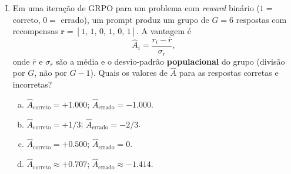 \documentclass{dlproblemset}
\begin{document}
\begin{enumerate}[I)]
\begin{enumerate}[a)]
    \item Comportamento esperado: SFT sempre descarta conhecimento do
          pré-treinamento; a correção é treinar do zero com os dados SFT.
    \item \textit{Catastrophic forgetting}: a LR alta por muitas épocas
          sobrescreve representações do pré-treinamento. Correção: reduzir
          a LR e limitar o número de épocas.
    \item \textit{Overfitting} nos próprios \textit{benchmarks}; a correção
          é adicionar mais \textit{benchmarks} ao conjunto de avaliação e
          reavaliar o modelo.
    \item Explosão de gradiente causada pela LR alta; a correção é aumentar
          o \textit{weight decay} para $1.0$ e manter a LR.
\end{enumerate}

\item {} Em uma iteração de GRPO para um problema
      com \textit{reward} binário ($1 = $ correto, $0 = $ errado),
      um prompt produz um grupo de $G = 6$ respostas com recompensas
      $\mathbf{r} = [1,\,1,\,0,\,1,\,0,\,1]$. A vantagem é
      \[
        \hat{A}_i = \frac{r_i - \overline{r}}{\sigma_r},
      \]
      onde $\overline{r}$ e $\sigma_r$ são a média e o desvio-padrão
      \textbf{populacional} do grupo (divisão por $G$, não por $G-1$).
      Quais os valores de $\hat{A}$ para as respostas corretas e
      incorretas?

\begin{enumerate}[a)]
    \item $\hat{A}_{\text{correto}} = +1.000$;
          $\hat{A}_{\text{errado}} = -1.000$.
    \item $\hat{A}_{\text{correto}} = +1/3$;
          $\hat{A}_{\text{errado}} = -2/3$.
    \item $\hat{A}_{\text{correto}} = +0.500$;
          $\hat{A}_{\text{errado}} = 0$.
    \item $\hat{A}_{\text{correto}} \approx +0.707$;
          $\hat{A}_{\text{errado}} \approx -1.414$.
\end{enumerate}


\end{enumerate}
\end{document}
